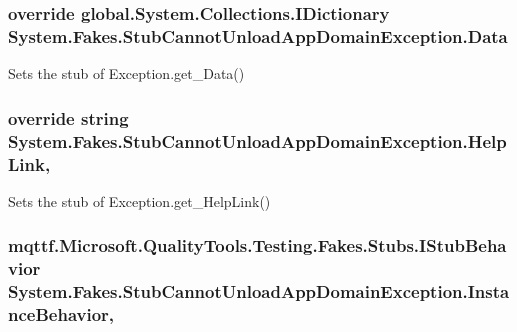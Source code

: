\hypertarget{class_system_1_1_fakes_1_1_stub_cannot_unload_app_domain_exception_a0d97c4c7b824a10a5553f65f1ba1ffc3}{
\subsubsection[{Data}]{\setlength{\rightskip}{0pt plus 5cm}override global.\-System.\-Collections.\-I\-Dictionary System.\-Fakes.\-Stub\-Cannot\-Unload\-App\-Domain\-Exception.\-Data\hspace{0.3cm}{\ttfamily [get]}}}\label{class_system_1_1_fakes_1_1_stub_cannot_unload_app_domain_exception_a0d97c4c7b824a10a5553f65f1ba1ffc3}


Sets the stub of Exception.\-get\-\_\-\-Data()

\hypertarget{class_system_1_1_fakes_1_1_stub_cannot_unload_app_domain_exception_a3b82b68504a54995e185225ca84c04d7}{
\subsubsection[{Help\-Link}]{\setlength{\rightskip}{0pt plus 5cm}override string System.\-Fakes.\-Stub\-Cannot\-Unload\-App\-Domain\-Exception.\-Help\-Link\hspace{0.3cm}{\ttfamily [get]}, {\ttfamily [set]}}}\label{class_system_1_1_fakes_1_1_stub_cannot_unload_app_domain_exception_a3b82b68504a54995e185225ca84c04d7}


Sets the stub of Exception.\-get\-\_\-\-Help\-Link()

\hypertarget{class_system_1_1_fakes_1_1_stub_cannot_unload_app_domain_exception_a3e2f30e6a29640732ddebb91401bacf9}{
\subsubsection[{Instance\-Behavior}]{\setlength{\rightskip}{0pt plus 5cm}mqttf.\-Microsoft.\-Quality\-Tools.\-Testing.\-Fakes.\-Stubs.\-I\-Stub\-Behavior System.\-Fakes.\-Stub\-Cannot\-Unload\-App\-Domain\-Exception.\-Instance\-Behavior\hspace{0.3cm}{\ttfamily [get]}, {\ttfamily [set]}}}\label{class_system_1_1_fakes_1_1_stub_cannot_unload_app_domain_exception_a3e2f30e6a29640732ddebb91401bacf9}


